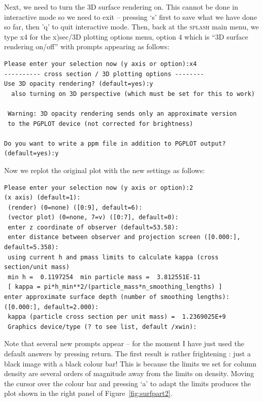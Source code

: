\documentclass[a4paper,10pt]{article}
\newcommand{\splash}{\textsc{splash }}
\begin{document}
 Next, we need to turn the 3D surface rendering on. This cannot be done in interactive mode so we need to exit -- pressing `s' first to save what we have done so far, then 'q' to quit interactive mode. Then, back at the \splash main menu, we type x4 for the x)sec/3D plotting options menu, option 4 which is ``3D surface rendering on/off'' with prompts appearing as follows:
\begin{verbatim}
Please enter your selection now (y axis or option):x4
---------- cross section / 3D plotting options --------
Use 3D opacity rendering? (default=yes):y
  also turning on 3D perspective (which must be set for this to work)

 Warning: 3D opacity rendering sends only an approximate version 
 to the PGPLOT device (not corrected for brightness) 

Do you want to write a ppm file in addition to PGPLOT output? (default=yes):y
\end{verbatim}
Now we replot the original plot with the new settings as follows:
\begin{verbatim}
Please enter your selection now (y axis or option):2
(x axis) (default=1):
 (render) (0=none) ([0:9], default=6):
 (vector plot) (0=none, 7=v) ([0:7], default=0):
 enter z coordinate of observer (default=53.58):
 enter distance between observer and projection screen ([0.000:], default=5.358):
 using current h and pmass limits to calculate kappa (cross section/unit mass)
 min h =  0.1197254  min particle mass =  3.812551E-11
 [ kappa = pi*h_min**2/(particle_mass*n_smoothing_lengths) ]
enter approximate surface depth (number of smoothing lengths): ([0.000:], default=2.000):
 kappa (particle cross section per unit mass) =  1.2369025E+9
 Graphics device/type (? to see list, default /xwin): 
\end{verbatim}
Note that several new prompts appear -- for the moment I have just used the default answers by pressing return. The first result is rather frightening : just a black image with a black colour bar! This is because the limits we set for column density are several orders of magnitude away from the limits on density. Moving the cursor over the colour bar and pressing `a' to adapt the limits produces the plot shown in the right panel of Figure~\ref{fig:surfpart2}.
\end{document}
